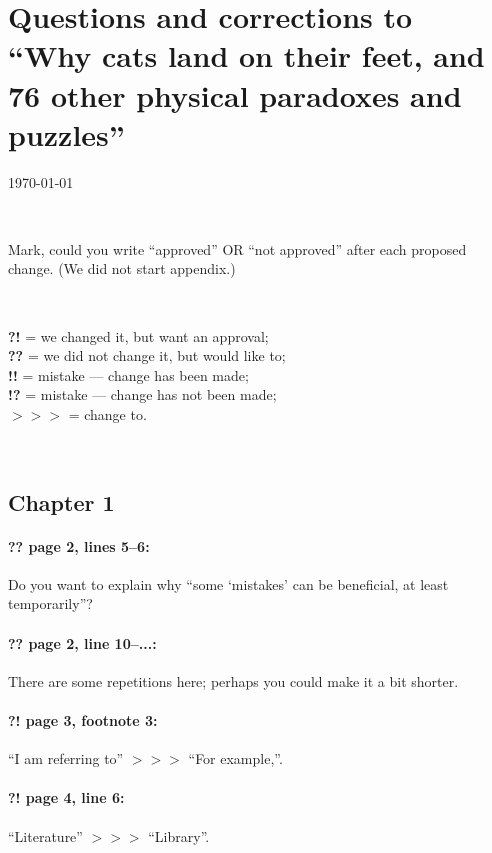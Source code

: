 \documentclass[twoside]{article}
\begin{document}
\pagestyle{empty}

\section*{Questions and corrections to\\
``Why cats land on their feet, and 76 other physical paradoxes
and puzzles''}

\today

\

Mark, could you write ``approved'' OR ``not approved'' after each proposed change.
(We did not start appendix.)

\

\noindent
\textbf{?!} = we changed it, but want an approval;\\
\textbf{??} = we did not change it, but would like to;\\
\textbf{!!} = mistake --- change has been made;\\
\textbf{!?} = mistake --- change has not been made;\\
$>\!>\!>$ = change to.

\

\subsection*{Chapter 1}

\paragraph{?? page 2, lines 5--6:} Do you want to explain why “some ‘mistakes’ can be beneficial, at least temporarily”?

\paragraph{?? page 2, line 10--...:} There are some repetitions here; perhaps you could make it a bit shorter.

\paragraph{?! page 3, footnote 3:} “I am referring to” $>\!>\!>$ “For example,”.

\paragraph{?! page 4, line 6:} “Literature” $>\!>\!>$ “Library”.
\end{document}
